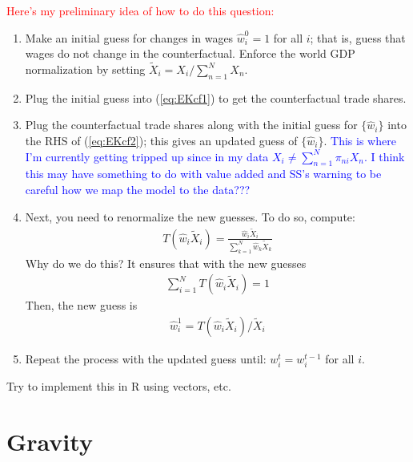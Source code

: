\documentclass[12pt]{article}
\begin{document}
\textcolor{red}{Here's my preliminary idea of how to do this question:}
\begin{enumerate}
\item Make an initial guess for changes in wages $\hat w^{0}_i = 1$ for all $i$; that is, guess that wages do not change in the counterfactual. Enforce the world GDP normalization by setting $\tilde X_i = X_i/\sum_{n=1}^N X_n$.
\item Plug the initial guess into (\ref{eq:EKcf1}) to get the counterfactual trade shares.
\item Plug the counterfactual trade shares along with the initial guess for $\{\hat w_i\}$ into the RHS of (\ref{eq:EKcf2}); this gives an updated guess of $\{\hat w_i\}$. \textcolor{Blue}{This is where I'm currently getting tripped up since in my data $X_i \neq \sum_{n=1}^N \pi_{ni} X_n$. I think this may have something to do with value added and SS's warning to be careful how we map the model to the data???}
\item Next, you need to renormalize the new guesses. To do so, compute:
\begin{align*}
T(\hat w_i \tilde X_i) = \frac{\hat w_i \tilde X_i}{\sum_{k=1}^N \hat w_k \tilde X_k}
\end{align*}
Why do we do this? It ensures that with the new guesses
\begin{align*}
\sum_{i=1}^N T(\hat w_i\tilde X_i) = 1
\end{align*}
Then, the new guess is
\begin{align*}
\hat w^{1}_i = T(\hat w_i\tilde X_i)/\tilde X_i
\end{align*}
\item Repeat the process with the updated guess until: $w^t_i = w^{t-1}_i$ for all $i$.
\end{enumerate}
Try to implement this in R using vectors, etc.



\newpage

\section{Gravity} 
\end{document}
